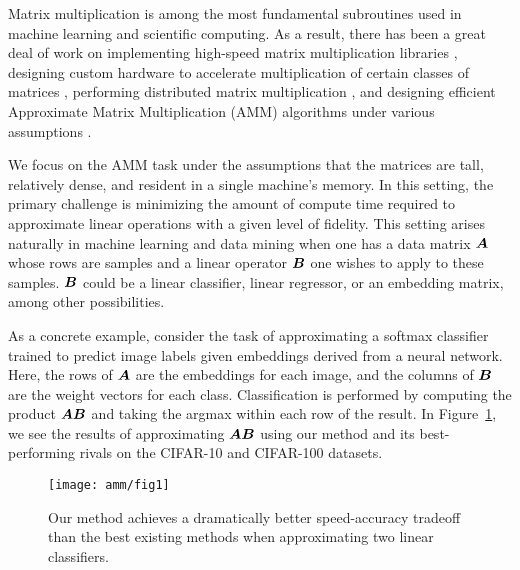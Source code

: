 
Matrix multiplication is among the most fundamental subroutines used in machine learning and scientific computing. As a result, there has been a great deal of work on implementing high-speed matrix multiplication libraries \cite{pytorch,eigen,tensorflow}, designing custom hardware to accelerate multiplication of certain classes of matrices \cite{eie,eyeriss,scnn,tpu},
performing distributed matrix multiplication \cite{distributedCoded, shortDot, entangledPolynomial, matmulCommunicationBounds},
and designing efficient Approximate Matrix Multiplication (AMM) algorithms under various assumptions%
.

We focus on the AMM task under the assumptions that the matrices are tall, relatively dense, and resident in a single machine's memory. In this setting, the primary challenge is minimizing the amount of compute time required to approximate linear operations with a given level of fidelity.
This setting arises naturally in machine learning and data mining when one has a data matrix $\bm{A}$ whose rows are samples and a linear operator $\bm{B}$ one wishes to apply to these samples. $\bm{B}$ could be a linear classifier, linear regressor, or an embedding matrix, among other possibilities.

As a concrete example, consider the task of approximating a softmax classifier trained to predict image labels given embeddings derived from a neural network. Here, the rows of $\bm{A}$ are the embeddings for each image, and the columns of $\bm{B}$ are the weight vectors for each class. Classification is performed by computing the product $\bm{A}\bm{B}$ and taking the argmax within each row of the result.
In Figure~\ref{fig:fig1}, we see the results of approximating $\bm{A}\bm{B}$ using our method and its best-performing rivals \cite{hashjl, sparsePCA} on the CIFAR-10 and CIFAR-100 datasets.
\vspace{1mm}
\begin{figure}[h]
\begin{center}
\texttt{[image: amm/fig1]}
\caption{Our method achieves a dramatically better speed-accuracy tradeoff than the best existing methods when approximating two linear classifiers.}
\label{fig:fig1}
\end{center}
\end{figure}
\vspace{-1mm}

